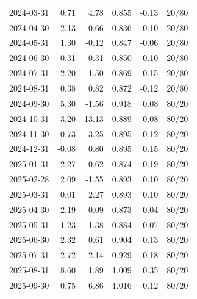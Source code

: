 \begin{center}
\begin{longtable}{lrrrrr}
2024-03-31 & 0.71 & 4.78 & 0.855 & -0.13 & 20/80 \\
2024-04-30 & -2.13 & 0.66 & 0.836 & -0.10 & 20/80 \\
2024-05-31 & 1.30 & -0.12 & 0.847 & -0.06 & 20/80 \\
2024-06-30 & 0.31 & 0.31 & 0.850 & -0.10 & 20/80 \\
2024-07-31 & 2.20 & -1.50 & 0.869 & -0.15 & 20/80 \\
2024-08-31 & 0.38 & 0.82 & 0.872 & -0.12 & 20/80 \\
2024-09-30 & 5.30 & -1.56 & 0.918 & 0.08 & 80/20 \\
2024-10-31 & -3.20 & 13.13 & 0.889 & 0.08 & 80/20 \\
2024-11-30 & 0.73 & -3.25 & 0.895 & 0.12 & 80/20 \\
2024-12-31 & -0.08 & 0.80 & 0.895 & 0.15 & 80/20 \\
2025-01-31 & -2.27 & -0.62 & 0.874 & 0.19 & 80/20 \\
2025-02-28 & 2.09 & -1.55 & 0.893 & 0.10 & 80/20 \\
2025-03-31 & 0.01 & 2.27 & 0.893 & 0.10 & 80/20 \\
2025-04-30 & -2.19 & 0.09 & 0.873 & 0.04 & 80/20 \\
2025-05-31 & 1.23 & -1.38 & 0.884 & 0.07 & 80/20 \\
2025-06-30 & 2.32 & 0.61 & 0.904 & 0.13 & 80/20 \\
2025-07-31 & 2.72 & 2.14 & 0.929 & 0.18 & 80/20 \\
2025-08-31 & 8.60 & 1.89 & 1.009 & 0.35 & 80/20 \\
2025-09-30 & 0.75 & 6.86 & 1.016 & 0.12 & 80/20 \\
\bottomrule
\end{longtable}
\end{center}
